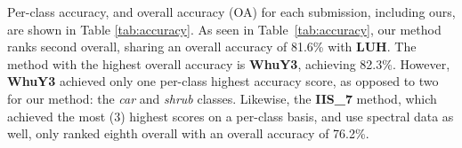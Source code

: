 \documentclass[final,3p,times,twocolumn,authoryear]{elsarticle}
\begin{document}
Per-class accuracy, and overall accuracy (OA) for each submission, including ours, are shown in Table \ref{tab:accuracy}. 
As seen in Table~\ref{tab:accuracy}, our method ranks second overall, sharing an overall accuracy of 81.6\% with {\bf LUH}.
The method with the highest overall accuracy is {\bf WhuY3}, achieving 82.3\%. 
However, {\bf WhuY3} achieved only one per-class highest accuracy score, as opposed to two for our method: the {\it car} and {\it shrub} classes.  
Likewise, the {\bf IIS\_7} method, which achieved the most (3) highest scores on a per-class basis, and use spectral data as well, only ranked eighth overall with an overall accuracy of 76.2\%. 
\end{document}

